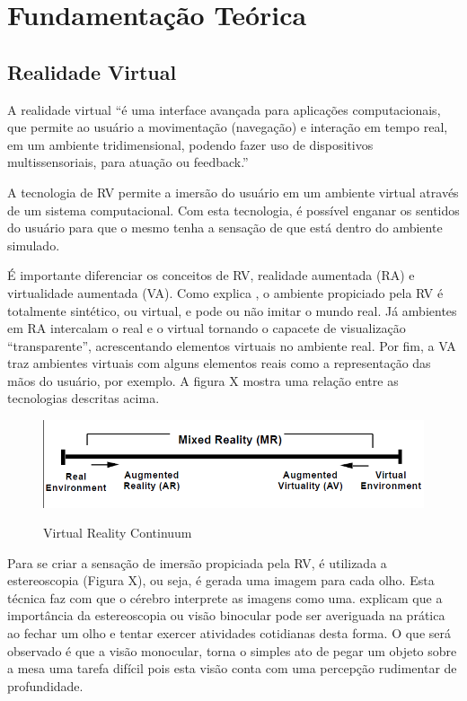 \chapter{Fundamentação Teórica}
\label{c.fundamentacao}

\section{Realidade Virtual}
\label{s.rv}
A realidade virtual “é uma interface avançada para aplicações computacionais, que permite ao usuário a movimentação (navegação) e interação em tempo real, em um ambiente tridimensional, podendo fazer uso de dispositivos multissensoriais, para atuação ou feedback.” \cite[p. ~7]{torilivro}

A tecnologia de RV permite a imersão do usuário em um ambiente virtual através de um sistema computacional. Com esta tecnologia, é possível enganar os sentidos do usuário para que o mesmo tenha a sensação de que está dentro do ambiente simulado. 

É importante diferenciar os conceitos de RV, realidade aumentada (RA) e virtualidade aumentada (VA). Como explica \cite{milgram}, o ambiente propiciado pela RV é totalmente sintético, ou virtual, e pode ou não imitar o mundo real. Já ambientes em RA intercalam o real e o virtual tornando o capacete de visualização “transparente”, acrescentando elementos virtuais no ambiente real. Por fim, a VA traz ambientes virtuais com alguns elementos reais como a representação das mãos do usuário, por exemplo. A figura X mostra uma relação entre as tecnologias descritas acima.

\begin{figure}[ht]
	\caption{\small Virtual Reality Continuum}
	\centering
	\includegraphics[scale=0.7]{Imagens/milgram.png}
	\label{f.milgram}
\end{figure}

Para se criar a sensação de imersão propiciada pela RV, é utilizada a estereoscopia (Figura X), ou seja, é gerada uma imagem para cada olho. Esta técnica faz com que o cérebro interprete as imagens como uma.  explicam que a importância da estereoscopia ou visão binocular pode ser averiguada na prática ao fechar um olho e tentar exercer atividades cotidianas desta forma. O que será observado é que a visão monocular, torna o simples ato de pegar um objeto sobre a mesa uma tarefa difícil pois esta visão conta com uma percepção rudimentar de profundidade.

